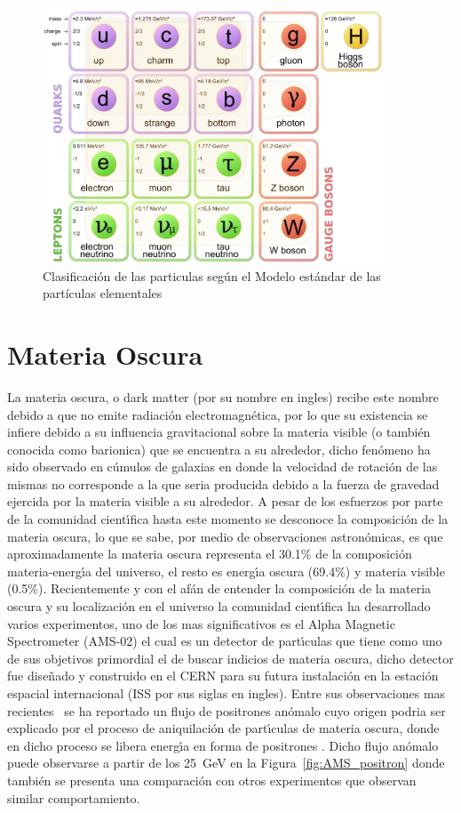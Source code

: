 \begin{figure}
\begin{center}
  \includegraphics[width=4.0in]{standard-model.png}
  \caption{Clasificaci\'on de las particulas seg\'un el Modelo est\'andar de las part\'iculas elementales}
  \label{fig:ME}
\end{center}
\end{figure}


\section{Materia Oscura}

La materia oscura, o dark matter (por su nombre en ingles) recibe este nombre debido a que no emite radiaci\'on electromagn\'etica, por lo que su existencia se infiere debido a su influencia gravitacional sobre la materia visible (o tambi\'en conocida como barionica) que se encuentra a su alrededor, dicho fen\'omeno ha sido observado en c\'umulos de galaxias en donde la velocidad de rotaci\'on de las mismas no corresponde a la que seria producida debido a la fuerza de gravedad ejercida por la materia visible a su alrededor. A pesar de los esfuerzos por parte de la comunidad cient\'{\i}fica hasta este momento se desconoce la composici\'on de la materia oscura, lo que se sabe, por medio de observaciones astron\'omicas, es que aproximadamente la materia oscura representa el 30.1\%  de la composici\'on materia-energ\'{\i}a del universo, el resto es energ\'{\i}a oscura (69.4\%) y materia visible (0.5\%). Recientemente y con el af\'an de entender la composici\'on de la materia oscura y su localizaci\'on en el universo la comunidad cient\'{\i}fica ha desarrollado varios experimentos, uno de los mas significativos es el Alpha Magnetic Spectrometer (AMS-02) el cual es un detector de part\'{\i}culas que tiene como uno de sus objetivos primordial el de buscar indicios de materia oscura, dicho detector fue dise\~nado y construido en el CERN para su futura instalaci\'on en la estaci\'on espacial internacional (ISS por sus siglas en ingles). Entre sus observaciones mas recientes~\cite{ams:cern} se ha reportado un flujo de positrones an\'omalo cuyo origen podria ser explicado por el proceso de aniquilaci\'on de part\'{\i}culas de materia oscura, donde en dicho proceso se libera energ\'{\i}a en forma de positrones .  Dicho flujo an\'omalo puede observarse a partir de los 25~GeV en la Figura~\ref{fig:AMS_positron} donde tambi\'en se presenta una comparaci\'on con otros experimentos que observan similar comportamiento.

